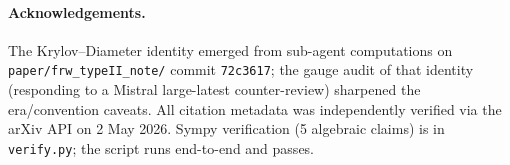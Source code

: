 \documentclass[11pt]{article}
\theoremstyle{definition}
\theoremstyle{remark}
\begin{document}
\paragraph{Acknowledgements.} The Krylov--Diameter identity emerged from
sub-agent computations on \texttt{paper/frw\_typeII\_note/} commit
\texttt{72c3617}; the gauge audit of that identity (responding to a
Mistral large-latest counter-review) sharpened the era/convention
caveats. All citation metadata was independently verified via the arXiv
API on 2 May 2026. Sympy verification (5 algebraic claims) is in
\texttt{verify.py}; the script runs end-to-end and passes.



\end{document}
